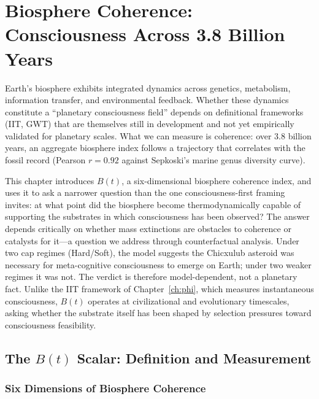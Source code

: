 
\chapter{Biosphere Coherence: Consciousness Across 3.8 Billion Years}
\label{ch:biosphere}


Earth's biosphere exhibits integrated dynamics across genetics, metabolism, information transfer, and environmental feedback. Whether these dynamics constitute a ``planetary consciousness field'' depends on definitional frameworks (IIT, GWT) that are themselves still in development and not yet empirically validated for planetary scales. What we can measure is coherence: over 3.8 billion years, an aggregate biosphere index follows a trajectory that correlates with the fossil record (Pearson $r = 0.92$ against Sepkoski's marine genus diversity curve).

This chapter introduces $B(t)$, a six-dimensional biosphere coherence index, and uses it to ask a narrower question than the one consciousness-first framing invites: at what point did the biosphere become thermodynamically capable of supporting the substrates in which consciousness has been observed? The answer depends critically on whether mass extinctions are obstacles to coherence or catalysts for it---a question we address through counterfactual analysis. Under two cap regimes (Hard/Soft), the model suggests the Chicxulub asteroid was necessary for meta-cognitive consciousness to emerge on Earth; under two weaker regimes it was not. The verdict is therefore model-dependent, not a planetary fact. Unlike the IIT framework of Chapter~\ref{ch:phi}, which measures instantaneous consciousness, $B(t)$ operates at civilizational and evolutionary timescales, asking whether the substrate itself has been shaped by selection pressures toward consciousness feasibility.

\section{The $B(t)$ Scalar: Definition and Measurement}

\subsection{Six Dimensions of Biosphere Coherence}

